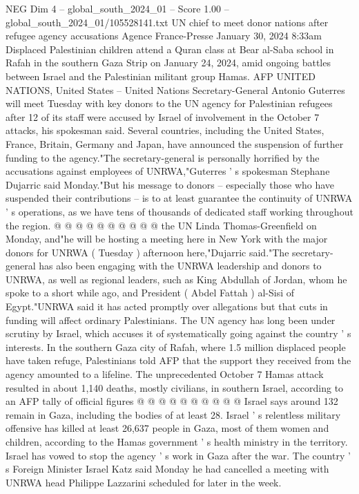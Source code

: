 \begin{textsample}{NEG Dim 4 – global\_south\_2024\_01 – Score 1.00 – global\_south\_2024\_01/105528141.txt}  \label{ex:f4_neg_083}
UN chief to meet donor nations after refugee agency accusations Agence France-Presse January 30, 2024 8:33am Displaced Palestinian children attend a Quran class at Bear al-Saba school in Rafah in the southern Gaza Strip on January 24, 2024, amid ongoing battles between Israel and the Palestinian militant group Hamas.
AFP UNITED NATIONS, United States -- United Nations Secretary-General Antonio Guterres will meet Tuesday with key donors to the UN agency for Palestinian refugees after 12 of its staff were accused by Israel of involvement in the October 7 attacks, his spokesman said.
Several countries, including the United States, France, Britain, Germany and Japan, have announced the suspension of further funding to the agency."The secretary-general is personally horrified by the accusations against employees of UNRWA,"Guterres ' s spokesman Stephane Dujarric said Monday."But his message to donors -- especially those who have suspended their contributions -- is to at least guarantee the continuity of UNRWA ' s operations, as we have tens of thousands of dedicated staff working throughout the region. @ @ @ @ @ @ @ @ @ @ the UN Linda Thomas-Greenfield on Monday, and"he will be hosting a meeting here in New York with the major donors for UNRWA ( Tuesday ) afternoon here,"Dujarric said."The secretary-general has also been engaging with the UNRWA leadership and donors to UNRWA, as well as regional leaders, such as King Abdullah of Jordan, whom he spoke to a short while ago, and President ( Abdel Fattah ) al-Sisi of Egypt."UNRWA said it has acted promptly over allegations but that cuts in funding will affect ordinary Palestinians.
The UN agency has long been under scrutiny by Israel, which accuses it of systematically going against the country ' s interests.
In the southern Gaza city of Rafah, where 1.5 million displaced people have taken refuge, Palestinians told AFP that the support they received from the agency amounted to a lifeline.
The unprecedented October 7 Hamas attack resulted in about 1,140 deaths, mostly civilians, in southern Israel, according to an AFP tally of official figures @ @ @ @ @ @ @ @ @ @ Israel says around 132 remain in Gaza, including the bodies of at least 28.
Israel ' s relentless military offensive has killed at least 26,637 people in Gaza, most of them women and children, according to the Hamas government ' s health ministry in the territory.
Israel has vowed to stop the agency ' s work in Gaza after the war.
The country ' s Foreign Minister Israel Katz said Monday he had cancelled a meeting with UNRWA head Philippe Lazzarini scheduled for later in the week.

\end{textsample}
